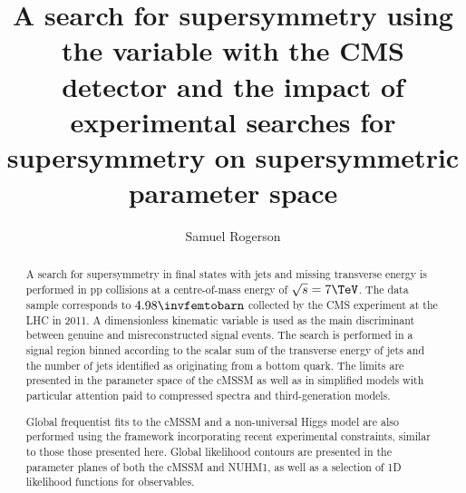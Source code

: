 \documentclass[]{mythesis}
\title{A search for supersymmetry using the \aT variable with the CMS detector
    and the impact of experimental searches for supersymmetry on supersymmetric
parameter space}
\author{Samuel Rogerson}
\begin{document}
    \maketitle
    \begin{abstract}

        A search for supersymmetry in final states with jets and missing
        transverse energy is performed in pp collisions at a centre-of-mass
        energy of $\sqrt{s}=7\TeV$. The data sample corresponds to
        $4.98\invfemtobarn$ collected by the CMS experiment at the LHC in 2011.
        A dimensionless kinematic variable is used as the main discriminant
        between genuine and misreconstructed signal events. The search is
        performed in a signal region binned according to the scalar sum of the
        transverse energy of jets and the number of jets identified as
        originating from a bottom quark.  The limits are presented in the
        parameter space of the \ac{cMSSM} as well as in simplified models with
        particular attention paid to compressed spectra and third-generation
        models.

        Global frequentist fits to the \ac{cMSSM} and a non-universal Higgs
        model are also performed using the \Mastercode framework incorporating
        recent experimental constraints, similar to those those presented here.
        Global likelihood contours are presented in the parameter planes of both
        the \ac{cMSSM} and NUHM1, as well as a selection of 1D likelihood
        functions for observables.
  
    \end{abstract}
  
\setcounter{page}{3} \tableofcontents \listoffigures

    \newpage
    \acresetall

    
    
    
    
    
    

    \printbibliography
\end{document}
